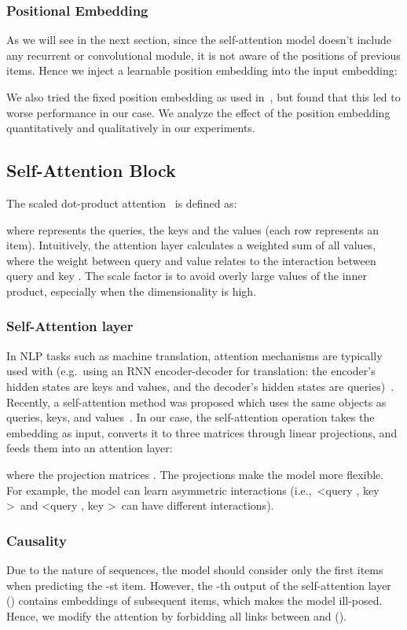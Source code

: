 \documentclass[conference]{IEEEtran}
\newcommand{\xhdr}[1]{\subsubsection*{\bf #1}}
\begin{document}
\xhdr{Positional Embedding}
As we will see in the next section, since the self-attention model doesn't include any recurrent or convolutional module, it is not aware of the positions of previous items. Hence we inject a learnable position embedding  into the input embedding:

We also tried the fixed position embedding as used in~\cite{transform}, 
but found that this led to worse performance in our case.
We analyze the effect of the position embedding quantitatively and qualitatively in our experiments. 


\subsection{Self-Attention Block}

The scaled dot-product attention~\cite{transform} is defined as:

where  represents the queries,  
the keys and  
the values (each row represents an item). Intuitively, the attention layer calculates a weighted sum of all values, where the weight between query  and value  relates to
the interaction between query  and key . The scale factor  is to avoid 
overly large
values of the inner product, especially when the dimensionality is high.

\xhdr{Self-Attention layer} In NLP tasks 
such as
machine translation,
attention mechanisms
are typically used
with  (e.g.~using an RNN encoder-decoder for translation: the encoder's
hidden states
are keys and values, and the decoder's
hidden states
are queries)~\cite{DBLP:journals/corr/BahdanauCB14}. 
Recently, a self-attention method was proposed which uses the same objects as queries, keys, and values~\cite{transform}. In our case, the self-attention operation takes the embedding  as input, converts it to three matrices through linear projections, and feeds them into an attention layer:

where the projection matrices . The projections make the model more flexible. For example, the model can learn asymmetric interactions (i.e.,~\textless query , key \textgreater~and \textless query , key \textgreater~can have different interactions).


\xhdr{Causality} Due to the nature of sequences, the model should consider only the first  items when
predicting
the -st item. However, the -th output of the self-attention layer () contains embeddings of subsequent items, which makes the model 
ill-posed.
Hence, we modify the attention by forbidding all links between  and  ().
\end{document}
